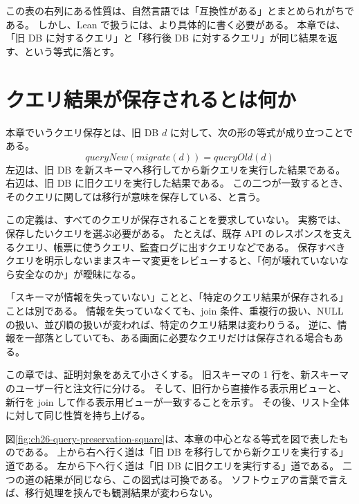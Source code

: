 この表の右列にある性質は、自然言語では「互換性がある」とまとめられがちである。
しかし、Lean で扱うには、より具体的に書く必要がある。
本章では、「旧 DB に対するクエリ」と「移行後 DB に対するクエリ」が同じ結果を返す、という等式に落とす。

\section{クエリ結果が保存されるとは何か}

\begin{definitionbox}
本章でいうクエリ保存とは、旧 DB \(d\) に対して、次の形の等式が成り立つことである。
\[
  \mathit{queryNew}(\mathit{migrate}(d)) = \mathit{queryOld}(d)
\]
左辺は、旧 DB を新スキーマへ移行してから新クエリを実行した結果である。
右辺は、旧 DB に旧クエリを実行した結果である。
この二つが一致するとき、そのクエリに関しては移行が意味を保存している、と言う。
\end{definitionbox}

この定義は、すべてのクエリが保存されることを要求していない。
実務では、保存したいクエリを選ぶ必要がある。
たとえば、既存 API のレスポンスを支えるクエリ、帳票に使うクエリ、監査ログに出すクエリなどである。
保存すべきクエリを明示しないままスキーマ変更をレビューすると、「何が壊れていないなら安全なのか」が曖昧になる。

\begin{warningbox}
「スキーマが情報を失っていない」ことと、「特定のクエリ結果が保存される」ことは別である。
情報を失っていなくても、join 条件、重複行の扱い、NULL の扱い、並び順の扱いが変われば、特定のクエリ結果は変わりうる。
逆に、情報を一部落としていても、ある画面に必要なクエリだけは保存される場合もある。
\end{warningbox}

この章では、証明対象をあえて小さくする。
旧スキーマの 1 行を、新スキーマのユーザー行と注文行に分ける。
そして、旧行から直接作る表示用ビューと、新行を join して作る表示用ビューが一致することを示す。
その後、リスト全体に対して同じ性質を持ち上げる。


図\ref{fig:ch26-query-preservation-square}は、本章の中心となる等式を図で表したものである。
上から右へ行く道は「旧 DB を移行してから新クエリを実行する」道である。
左から下へ行く道は「旧 DB に旧クエリを実行する」道である。
二つの道の結果が同じなら、この図式は可換である。
ソフトウェアの言葉で言えば、移行処理を挟んでも観測結果が変わらない。

